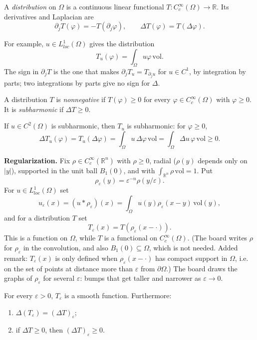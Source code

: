 \begin{definition}
\label{definition-distribution-board}
A \emph{distribution} on $\Omega$ is a
continuous linear functional
$T\colon C^\infty_c(\Omega)\to\mathbb{R}$.
Its derivatives and Laplacian are
$$
\partial_jT(\varphi)
=-T(\partial_j\varphi),
\qquad
\Delta T(\varphi)=T(\Delta\varphi).
$$
\end{definition}

\noindent
For example, $u\in L^1_{loc}(\Omega)$ gives
the distribution
$$
T_u(\varphi)=\int_\Omega u\varphi\,
\mathrm{vol}.
$$
The sign in $\partial_jT$ is the one that
makes $\partial_jT_u=T_{\partial_ju}$ for
$u\in C^1$, by integration by parts; two
integrations by parts give no sign for
$\Delta$.

\begin{definition}
\label{definition-subharmonic-distribution}
A distribution $T$ is \emph{nonnegative} if
$T(\varphi)\geq 0$ for every $\varphi\in
C^\infty_c(\Omega)$ with $\varphi\geq 0$. It
is \emph{subharmonic} if $\Delta T\geq 0$.
\end{definition}

\noindent
If $u\in C^2(\Omega)$ is subharmonic, then
$T_u$ is subharmonic: for $\varphi\geq 0$,
$$
\Delta T_u(\varphi)=T_u(\Delta\varphi)
=\int_\Omega u\,\Delta\varphi\,\mathrm{vol}
=\int_\Omega \Delta u\,\varphi\,\mathrm{vol}
\geq 0.
$$

\medskip\noindent
{\bf Regularization.} Fix $\rho\in
C^\infty_c(\mathbb{R}^n)$ with $\rho\geq
0$, radial ($\rho(y)$ depends only on
$|y|$), supported in the unit ball $B_1(0)$,
and with $\int_{\mathbb{R}^n}\rho\,
\mathrm{vol}=1$. Put
$$
\rho_\varepsilon(y)
=\varepsilon^{-n}\rho(y/\varepsilon).
$$
For $u\in L^1_{loc}(\Omega)$ set
$$
u_\varepsilon(x)=(u*\rho_\varepsilon)(x)
=\int_\Omega u(y)\rho_\varepsilon(x-y)
\,\mathrm{vol}(y),
$$
and for a distribution $T$ set
$$
T_\varepsilon(x)
=T(\rho_\varepsilon(x-\cdot)).
$$
This is a function on $\Omega$, while $T$ is
a functional on $C^\infty_c(\Omega)$. (The
board writes $\rho$ for $\rho_\varepsilon$ in
the convolution, and also
$B_1(0)\subseteq\Omega$, which is not
needed. Added remark: $T_\varepsilon(x)$ is only
defined when $\rho_\varepsilon(x-\cdot)$ has
compact support in $\Omega$, i.e. on the set
of points at distance more than
$\varepsilon$ from $\partial\Omega$.) The
board draws the graphs of $\rho_\varepsilon$
for several $\varepsilon$: bumps that get
taller and narrower as $\varepsilon\to 0$.

\begin{proposition}
\label{proposition-regularization-smooth}
For every $\varepsilon>0$, $T_\varepsilon$ is
a smooth function. Furthermore:
\begin{enumerate}
\item $\Delta(T_\varepsilon)
=(\Delta T)_\varepsilon$;
\item if $\Delta T\geq 0$, then
$(\Delta T)_\varepsilon\geq 0$.
\end{enumerate}
\end{proposition}

